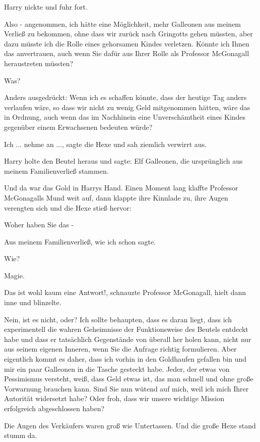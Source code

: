 Harry nickte und fuhr fort.

\glqq{}Also - angenommen, ich hätte eine Möglichkeit, mehr Galleonen aus meinem
Verließ zu bekommen, ohne dass wir zurück nach Gringotts gehen müssten, aber
dazu müsste ich die Rolle eines gehorsamen Kindes verletzen. Könnte ich Ihnen
das anvertrauen, auch wenn Sie dafür aus Ihrer Rolle als Professor McGonagall
heraustreten müssten?\grqq{}

\glqq{}Was?\grqq{}

\glqq{}Anders ausgedrückt: Wenn ich es schaffen könnte, dass der heutige Tag
anders verlaufen wäre, so dass wir nicht zu wenig Geld mitgenommen hätten, wäre
das in Ordnung, auch wenn das im Nachhinein eine Unverschämtheit eines Kindes
gegenüber einem Erwachsenen bedeuten würde?\grqq{}

\glqq{}Ich ... nehme an ...\grqq{}, sagte die Hexe und sah ziemlich verwirrt
aus.

Harry holte den Beutel heraus und sagte: \glqq{}Elf Galleonen, die ursprünglich
aus meinem Familienverließ stammen.\grqq{}

Und da war das Gold in Harrys Hand. Einen Moment lang klaffte Professor
McGonagalls Mund weit auf, dann klappte ihre Kinnlade zu, ihre Augen verengten
sich und die Hexe stieß hervor:

\glqq{}Woher haben Sie das -\grqq{}

\glqq{}Aus meinem Familienverließ, wie ich schon sagte.\grqq{}

\glqq{}Wie?\grqq{}

\glqq{}Magie.\grqq{}

\glqq{}Das ist wohl kaum eine Antwort!\grqq{}, schnauzte Professor McGonagall,
hielt dann inne und blinzelte.

\glqq{}Nein, ist es nicht, oder? Ich sollte behaupten, dass es daran liegt, dass
ich experimentell die wahren Geheimnisse der Funktionsweise des Beutels entdeckt
habe und dass er tatsächlich Gegenstände von überall her holen kann, nicht nur
aus seinem eigenen Inneren, wenn Sie die Anfrage richtig formulieren. Aber
eigentlich kommt es daher, dass ich vorhin in den Goldhaufen gefallen bin und
mir ein paar Galleonen in die Tasche gesteckt habe. Jeder, der etwas von
Pessimismus versteht, weiß, dass Geld etwas ist, das man schnell und ohne große
Vorwarnung brauchen kann. Sind Sie nun wütend auf mich, weil ich mich Ihrer
Autorität widersetzt habe? Oder froh, dass wir unsere wichtige Mission
erfolgreich abgeschlossen haben?\grqq{}

Die Augen des Verkäufers waren groß wie Untertassen. Und die große Hexe stand
stumm da.

